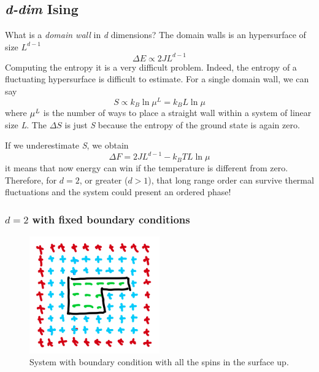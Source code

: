 \documentclass[../../Main/Main.tex]{subfiles}
\begin{document}
\subsection{\emph{d-dim} Ising}
What is a \emph{domain wall} in \emph{d} dimensions? The domain walls is an hypersurface of size \( L^{d-1} \)
\begin{equation}
  \Delta E \propto 2JL^{d-1}
\end{equation}
Computing the entropy it is a very difficult problem. Indeed, the entropy of a fluctuating hypersurface is difficult to estimate. 
For a single domain wall, we can say
\begin{equation}
  S \propto k_B \ln{\mu^L} = k_B L \ln{\mu}
\end{equation}
where  \( \mu^{\emph{L}} \) is the number of ways to place a straight wall within a system of linear size \emph{L}.
The \( \Delta S \)  is just \emph{S}  because the entropy of the ground state is again zero.
\begin{remark}
If we underestimate \emph{S}, we obtain
\begin{equation}
  \Delta F = 2JL^{d-1}-k_B T L \ln{\mu}
\end{equation}
it means that now energy can win if the temperature is different from zero. Therefore, for \( d=2 \),  or greater (\( d>1 \)), that long range order can survive  thermal fluctuations and the system could present an ordered phase!
\end{remark}

\subsubsection{$d = 2$ with fixed boundary conditions}

\begin{figure}[h!]
\centering
\includegraphics[width=0.5\textwidth]{./img/IMG1.png}
\caption{\label{fig:10_1} System with boundary condition with all the spins in the surface up.}
\end{figure}
\end{document}
